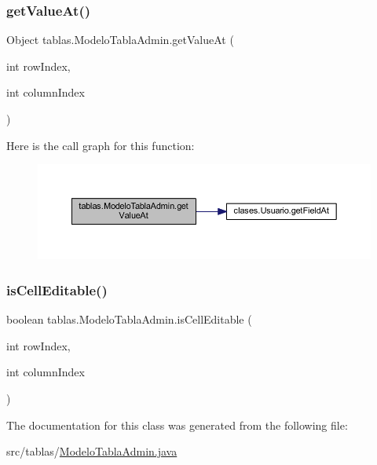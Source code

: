 \mbox{\label{classtablas_1_1_modelo_tabla_admin_a58534b1806090e0e2f171402e430cebc}} 
\subsubsection{\texorpdfstring{get\+Value\+At()}{getValueAt()}}
{\footnotesize\ttfamily Object tablas.\+Modelo\+Tabla\+Admin.\+get\+Value\+At (\begin{DoxyParamCaption}\item[{int}]{row\+Index,  }\item[{int}]{column\+Index }\end{DoxyParamCaption})}

Here is the call graph for this function\+:
\nopagebreak
\begin{figure}[H]
\begin{center}
\leavevmode
\includegraphics[width=350pt]{classtablas_1_1_modelo_tabla_admin_a58534b1806090e0e2f171402e430cebc_cgraph}
\end{center}
\end{figure}
\mbox{\label{classtablas_1_1_modelo_tabla_admin_a2cf76f675696d1fc2362585a35b3aff4}} 
\subsubsection{\texorpdfstring{is\+Cell\+Editable()}{isCellEditable()}}
{\footnotesize\ttfamily boolean tablas.\+Modelo\+Tabla\+Admin.\+is\+Cell\+Editable (\begin{DoxyParamCaption}\item[{int}]{row\+Index,  }\item[{int}]{column\+Index }\end{DoxyParamCaption})}



The documentation for this class was generated from the following file\+:\begin{DoxyCompactItemize}
\item 
src/tablas/\mbox{\hyperlink{_modelo_tabla_admin_8java}{Modelo\+Tabla\+Admin.\+java}}\end{DoxyCompactItemize}
